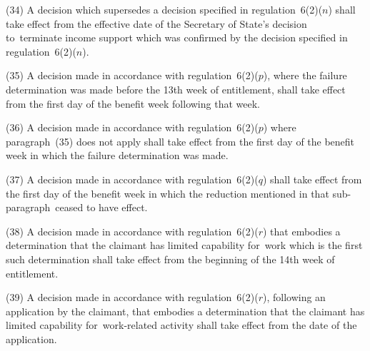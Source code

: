 \documentclass[12pt,a4paper]{article}
\begin{document}
(34) A decision which supersedes a decision specified in regulation~6(2)($n$)  shall take effect from the effective date of the Secretary of State’s decision to~terminate income support which was confirmed by the decision specified in regulation~6(2)($n$).

(35) A decision made in accordance with regulation~6(2)($p$), where the failure determination was made before the 13th week of entitlement, shall take effect from the first day of the benefit week following that week.

(36) A decision made in accordance with regulation~6(2)($p$)  where paragraph~(35) does not apply shall take effect from the first day of the benefit week in which the failure determination was made.

(37) A decision made in accordance with regulation~6(2)($q$)  shall take effect from the first day of the benefit week in which the reduction mentioned in that sub-paragraph~ceased to have effect.

(38) A decision made in accordance with regulation~6(2)($r$)  that embodies a determination that the claimant has limited capability for~work which is the first such determination shall take effect from the beginning of the 14th week of entitlement.

(39) A decision made in accordance with regulation~6(2)($r$), following an application by the claimant, that embodies a determination that the claimant has limited capability for~work-related activity shall take effect from the date of the application.
\end{document}
